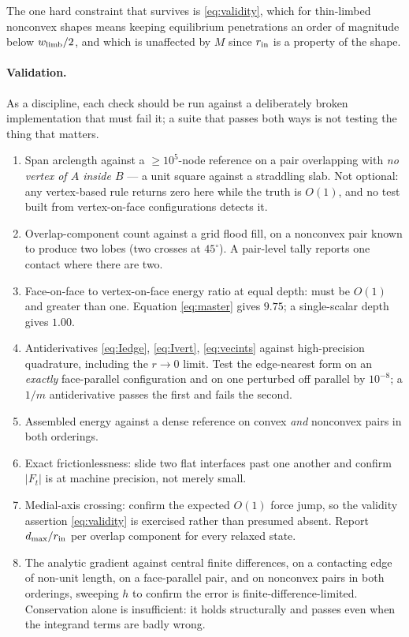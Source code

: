 \documentclass[11pt]{article}
\begin{document}
The one hard constraint that survives is \eqref{eq:validity}, which for thin-limbed nonconvex shapes means keeping equilibrium penetrations an order of magnitude below $w_{\rm limb}/2$, and which is unaffected by $M$ since $r_{\rm in}$ is a property of the shape.

\paragraph{Validation.} As a discipline, each check should be run against a deliberately broken implementation that must fail it; a suite that passes both ways is not testing the thing that matters.
\begin{enumerate}\itemsep2pt
\item Span arclength against a $\ge10^5$-node reference on a pair overlapping with \emph{no vertex of $A$ inside $B$} --- a unit square against a straddling slab. Not optional: any vertex-based rule returns zero here while the truth is $O(1)$, and no test built from vertex-on-face configurations detects it.
\item Overlap-component count against a grid flood fill, on a nonconvex pair known to produce two lobes (two crosses at $45^\circ$). A pair-level tally reports one contact where there are two.
\item Face-on-face to vertex-on-face energy ratio at equal depth: must be $O(1)$ and greater than one. Equation \eqref{eq:master} gives $9.75$; a single-scalar depth gives $1.00$.
\item Antiderivatives \eqref{eq:Iedge}, \eqref{eq:Ivert}, \eqref{eq:vecints} against high-precision quadrature, including the $r\to0$ limit. Test the edge-nearest form on an \emph{exactly} face-parallel configuration and on one perturbed off parallel by $10^{-8}$; a $1/m$ antiderivative passes the first and fails the second.
\item Assembled energy against a dense reference on convex \emph{and} nonconvex pairs in both orderings.
\item Exact frictionlessness: slide two flat interfaces past one another and confirm $|F_t|$ is at machine precision, not merely small.
\item Medial-axis crossing: confirm the expected $O(1)$ force jump, so the validity assertion \eqref{eq:validity} is exercised rather than presumed absent. Report $d_{\max}/r_{\rm in}$ per overlap component for every relaxed state.
\item The analytic gradient against central finite differences, on a contacting edge of non-unit length, on a face-parallel pair, and on nonconvex pairs in both orderings, sweeping $h$ to confirm the error is finite-difference-limited. Conservation alone is insufficient: it holds structurally and passes even when the integrand terms are badly wrong.

\end{enumerate}
\end{document}

